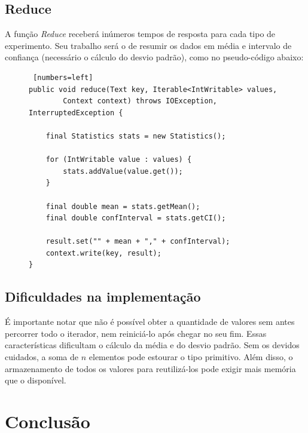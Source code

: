 \documentclass[brazil, a4paper,12pt]{article}
\begin{document}

\subsection{Reduce}
A função \emph{Reduce} receberá inúmeros tempos de resposta para cada tipo de experimento. Seu trabalho será o de resumir os dados em média e intervalo de confiança (necessário o cálculo do desvio padrão), como no pseudo-código abaixo:

\begin{figure} [!htb]
\begin{center}
\footnotesize
\begin{lstlisting} [numbers=left]
public void reduce(Text key, Iterable<IntWritable> values,
		Context context) throws IOException, InterruptedException {

	final Statistics stats = new Statistics();

	for (IntWritable value : values) {
		stats.addValue(value.get());
	}

	final double mean = stats.getMean();
	final double confInterval = stats.getCI();

	result.set("" + mean + "," + confInterval);
	context.write(key, result);
}
\end{lstlisting}
\end{center}
\end{figure}

\subsection {Dificuldades na implementação}

É importante notar que não é possível obter a quantidade de valores sem antes percorrer todo o iterador, nem reiniciá-lo após chegar no seu fim. Essas características dificultam o cálculo da média e do desvio padrão. Sem os devidos cuidados, a soma de $n$ elementos pode estourar o tipo primitivo. Além disso, o armazenamento de todos os valores para reutilizá-los pode exigir mais memória que o disponível.

\section {Conclusão}
\end{document}
